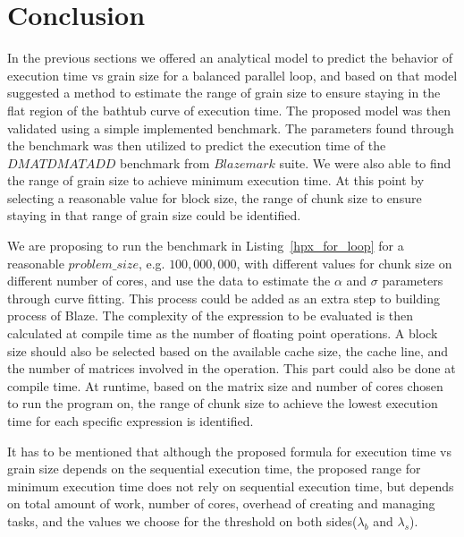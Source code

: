 \section{Conclusion}
In the previous sections we offered an analytical model to predict the behavior of execution time vs grain size for a balanced parallel loop, and based on that model suggested a method to estimate the range of grain size to ensure staying in the flat region of the bathtub curve of execution time. The proposed model was then validated using a simple implemented benchmark. The parameters found through the benchmark was then utilized to predict the execution time of the $DMATDMATADD$ benchmark from $Blazemark$ suite. We were also able to find the range of grain size to achieve minimum execution time. 
At this point by selecting a reasonable value for block size, the range of chunk size to ensure staying in that range of grain size could be identified.

We are proposing to run the benchmark in Listing~\ref{hpx_for_loop} for a reasonable $problem\_{size}$, e.g. $100,000,000$, with different values for chunk size on different number of cores, and use the data to estimate the $\alpha$ and $\sigma$ parameters through curve fitting. This process could be added as an extra step to building process of Blaze. 
The complexity of the expression to be evaluated is then calculated at compile time as the number of floating point operations. A block size should also be selected based on the available cache size, the cache line, and the number of matrices involved in the operation. This part could also be done at compile time.   
At runtime, based on the matrix size and number of cores chosen to run the program on, the range of chunk size to achieve the lowest execution time for each specific expression is identified.

It has to be mentioned that although the proposed formula for execution time vs grain size depends on the sequential execution time, the proposed range for minimum execution time does not rely on sequential execution time, but depends on total amount of work, number of cores, overhead of creating and managing tasks, and the values we choose for the threshold on both sides($\lambda_{b}$ and $\lambda_{s}$).
 





